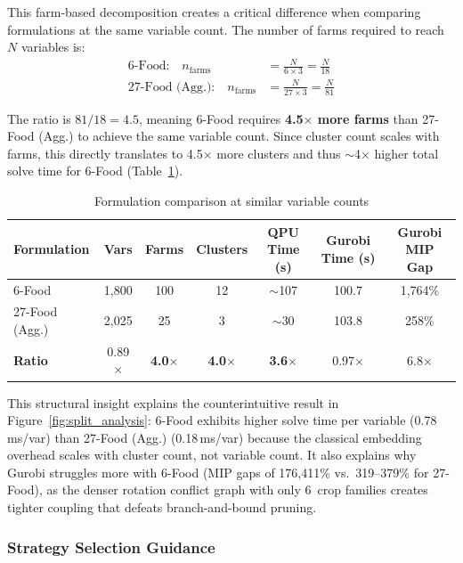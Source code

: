 This farm-based decomposition creates a critical difference when comparing formulations at the same variable count. The number of farms required to reach $N$ variables is:
\begin{align}
    \text{6-Food:} \quad n_{\text{farms}} &= \frac{N}{6 \times 3} = \frac{N}{18} \\
    \text{27-Food (Agg.):} \quad n_{\text{farms}} &= \frac{N}{27 \times 3} = \frac{N}{81}
\end{align}

\noindent The ratio is $81/18 = 4.5$, meaning 6-Food requires \textbf{4.5$\times$ more farms} than 27-Food (Agg.) to achieve the same variable count. Since cluster count scales with farms, this directly translates to 4.5$\times$ more clusters and thus $\sim$4$\times$ higher total solve time for 6-Food (Table~\ref{tab:formulation_comparison}).

\begin{table}[H]
\centering
\caption{Formulation comparison at similar variable counts}
\label{tab:formulation_comparison}
\small
\begin{tabular}{lcccccc}
\toprule
\textbf{Formulation} & \textbf{Vars} & \textbf{Farms} & \textbf{Clusters} & \textbf{QPU Time (s)} & \textbf{Gurobi Time (s)} & \textbf{Gurobi MIP Gap} \\
\midrule
6-Food & 1,800 & 100 & 12 & $\sim$107 & 100.7 & 1,764\% \\
27-Food (Agg.) & 2,025 & 25 & 3 & $\sim$30 & 103.8 & 258\% \\
\midrule
\textbf{Ratio} & 0.89$\times$ & \textbf{4.0$\times$} & \textbf{4.0$\times$} & \textbf{3.6$\times$} & 0.97$\times$ & 6.8$\times$ \\
\bottomrule
\end{tabular}
\end{table}

This structural insight explains the counterintuitive result in Figure~\ref{fig:split_analysis}: 6-Food exhibits higher solve time per variable (0.78\,ms/var) than 27-Food (Agg.) (0.18\,ms/var) because the classical embedding overhead scales with cluster count, not variable count. It also explains why Gurobi struggles more with 6-Food (MIP gaps of 176,411\% vs.\ 319--379\% for 27-Food), as the denser rotation conflict graph with only 6~crop families creates tighter coupling that defeats branch-and-bound pruning.

\subsubsection{Strategy Selection Guidance}

